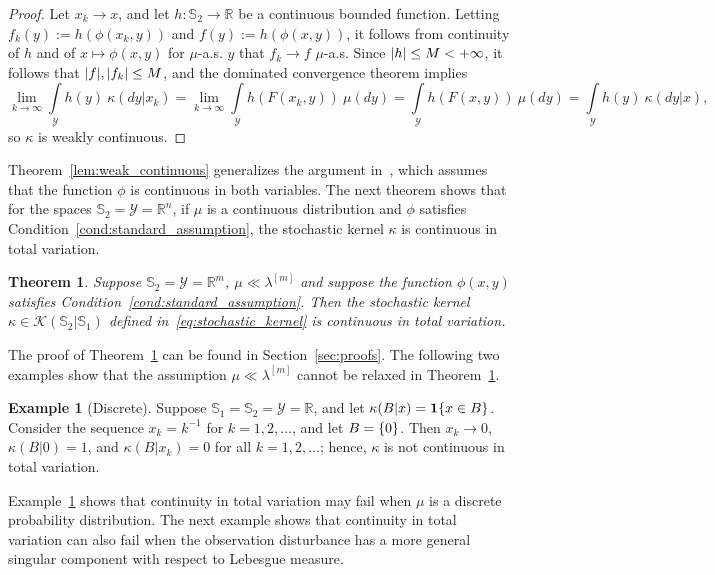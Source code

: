 \documentclass[11pt,onecolumn]{IEEEtran}  %
\newcommand{\Rb}{\mathbb{R}}
\newcommand{\Sb}{\mathbb{S}}
\newcommand{\Kc}{\mathcal{K}}
\newcommand{\Yc}{\mathcal{Y}}
\newcommand{\one}[1]{\mathbf{1}\set{#1}}
\newcommand{\defeq}{:=}%
\DeclarePairedDelimiter{\set}{\{}{\}}
\DeclarePairedDelimiter{\abs}{|}{|}
\newtheorem{theorem}{Theorem}
\theoremstyle{definition}
\newtheorem{example}{Example}
\begin{document}
\begin{proof}
    Let $x_k \to x$, and let $h : \Sb_2 \to \Rb$ be a continuous bounded function. Letting $f_k(y) \defeq h(\phi(x_k,y))$ and $f(y) \defeq h  (\phi(x,y))$, it follows from continuity of $h$ and of $x \mapsto \phi(x,y)$ for $\mu$-a.s. $y$ that $f_k \to f$ $\mu$-a.s. Since $\abs{h} \leq M < +\infty$, it follows that $\abs{f}, \abs{f_k} \leq M$, and the dominated convergence theorem implies
    \begin{equation*}
        \lim_{k \to \infty} \int\limits_{\Yc} h(y) \ \kappa(dy|x_k)
        =
        \lim_{k \to \infty} \int\limits_{\Yc} h(F(x_k,y)) \ \mu(dy)
        =
        \int\limits_{\Yc} h(F(x,y)) \ \mu(dy)
        =
        \int\limits_{\Yc} h(y) \ \kappa(dy|x),
    \end{equation*}
    so $\kappa$ is weakly continuous.
\end{proof}

Theorem~\ref{lem:weak_continuous} generalizes the argument in~\citet[p. 92]{hernandez-lerma_adaptive_1989}, which assumes that the function $\phi$ is continuous in both variables. The next theorem shows that for the spaces $\Sb_2 = \Yc = \Rb^n$, if $\mu$ is a continuous distribution and $\phi$ satisfies Condition~\ref{cond:standard_assumption}, the stochastic kernel $\kappa$ is continuous in total variation.

\begin{theorem} \label{thm:continuous_total_variation}
    Suppose $\Sb_2 = \Yc = \Rb^m$, $\mu \ll \lambda^{[m]}$ and suppose the function $\phi(x,y)$ satisfies Condition~\ref{cond:standard_assumption}. Then the stochastic kernel $\kappa \in \Kc(\Sb_2|\Sb_1)$ defined in~\eqref{eq:stochastic_kernel} is continuous in total variation.
\end{theorem}
The proof of Theorem~\ref{thm:continuous_total_variation} can be found in Section~\ref{sec:proofs}. The following two examples show that the assumption $\mu \ll \lambda^{[m]}$ cannot be relaxed in Theorem~\ref{thm:continuous_total_variation}.

\begin{example}[Discrete] \label{ex:delta_measure}
    Suppose $\Sb_1=\Sb_2=\Yc=\Rb$, and let $\kappa(B|x) = \one{x \in B}$. Consider the sequence $x_k = k^{-1}$ for $k=1,2,\dots$, and let $B = \set{0}$. Then $x_k \to 0$, $\kappa(B|0) = 1$, and $\kappa(B|x_k) = 0$ for all $k=1,2,\dots$; hence, $\kappa$ is not continuous in total variation.
\end{example}

Example~\ref{ex:delta_measure} shows that continuity in total variation may fail when $\mu$ is a discrete probability distribution. The next example shows that continuity in total variation can also fail when the observation disturbance has a more general singular component with respect to Lebesgue measure.
\end{document}
